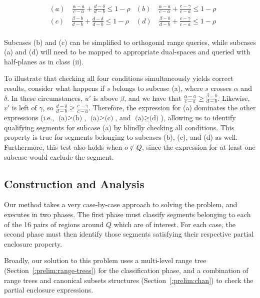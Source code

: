 \begin{align*}
& (a) \quad \frac{\alpha - a}{c - a} + \frac{d - \delta}{d - b} \leq 1 - \rho
& (b) \quad \frac{\alpha - a}{c - a} + \frac{c - \gamma}{c - a} \leq 1 - \rho \\
& (c) \quad \frac{\beta  - b}{d - b} + \frac{d - \delta}{d - b} \leq 1 - \rho  
& (d) \quad \frac{\beta  - b}{d - b} + \frac{c - \gamma}{c - a} \leq 1 - \rho \\
\end{align*}

Subcases (b) and (c) can be simplified to orthogonal range queries, while subcases (a) and (d) will need to be mapped to appropriate dual-spaces and queried with half-planes as in class (ii).

To illustrate that checking all four conditions simultaneously yields correct results, consider what happens if $s$ belongs to subcase (a), where $s$ crosses $\alpha$ and $\delta$. In these circumstances, $u'$ is above $\beta$, and we have that $\frac{\alpha - a}{c - a} \geq \frac{\beta - b}{d - b}$.  Likewise, $v'$ is left of $\gamma$, so $\frac{d - \delta}{d - b} \geq \frac{c - \gamma}{c - a}$.  Therefore, the expression for (a) dominates the other expressions (i.e., $\text{(a)} \geq \text{(b)}$, $\text{(a)} \geq \text{(c)}$, and $\text{(a)} \geq \text{(d)}$), allowing us to identify qualifying segments for subcase (a) by blindly checking all conditions. This property is true for segments belonging to subcases (b), (c), and (d) as well. Furthermore, this test also holds when $o \not \in Q$, since the expression for at least one subcase would exclude the segment.


\subsection{Construction and Analysis}
\label{:rectangles:ao:analysis}

Our method takes a very case-by-case approach to solving the problem, and executes in two phases.
The first phase must classify segments belonging to each of the 16 pairs of regions around $Q$ which are of interest. 
For each case, the second phase must then identify those segments satisfying their respective partial enclosure property. 

Broadly, our solution to this problem uses a multi-level range tree (Section~\ref{:prelim:range-trees}) for the classification phase, and a combination of range trees and canonical subsets structures (Section~\ref{:prelim:chan}) to check the partial enclosure expressions. 

